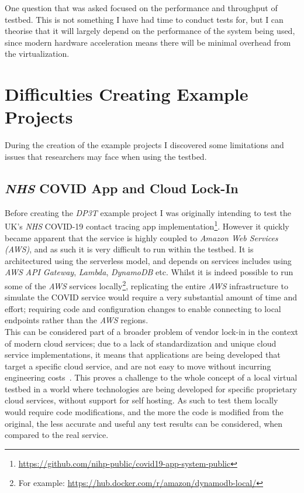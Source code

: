 \documentclass[
    author={Jacob Daniel Halsey},
    supervisor={Prof. Awais Rashid},
    degree={BSc},
    title={Building a Testbed for Evaluating Privacy Enhancing Technologies  (PETs)},
    subtitle={},
    type={software development},
    year={2021}
]{dissertation}
\begin{document}
One question that was asked focused on the performance and throughput
of testbed. This is not something I have had time to conduct tests for, but I can theorise that it will
largely depend on the performance of the system being used, since modern hardware acceleration
means there will be minimal overhead from the virtualization.

\section{Difficulties Creating Example Projects}
\label{sect:difficulties}

During the creation of the example projects I discovered some limitations and issues
that researchers may face when using the testbed.

\subsection{\emph{NHS} COVID App and Cloud Lock-In}

Before creating the \emph{DP3T} example project I was originally intending to test the UK's \emph{NHS} COVID-19 
contact tracing app implementation\footnote{\url{https://github.com/nihp-public/covid19-app-system-public}}. 
However it quickly became apparent that the service is highly coupled to
\emph{Amazon Web Services (AWS)}, and as such it is very difficult to run within the testbed.
It is architectured using the serverless model, and depends on services includes using \emph{AWS} 
\emph{API Gateway}, \emph{Lambda}, \emph{DynamoDB} etc.
Whilst it is indeed possible to run some of the \emph{AWS} services 
locally\footnote{For example: \url{https://hub.docker.com/r/amazon/dynamodb-local/}}, replicating
the entire \emph{AWS} infrastructure to simulate the COVID service would require a very substantial amount of 
time and effort; requiring code and configuration changes to enable connecting to local endpoints rather than the
\emph{AWS} regions.\\

This can be considered part of a broader problem of vendor lock-in in the context of modern
cloud services; due to a lack of standardization and unique cloud service implementations, it means
that applications are being developed that target a specific cloud service, and are not easy to move
without incurring engineering costs~\cite{cloud_lock_in}. This proves a challenge to the whole concept 
of a local virtual testbed in a world where technologies are being developed for specific proprietary
cloud services, without support for self hosting. As such to test them locally would require code modifications,
and the more the code is modified from the original, the less accurate and useful any test results can be 
considered, when compared to the real service.
\end{document}
